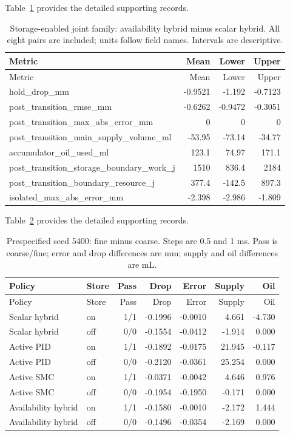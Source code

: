 \documentclass[11pt,a4paper]{article}
\begin{document}
\begingroup\hypersetup{hypertexnames=true}\small\setlength{\tabcolsep}{4pt}
Table~\ref{supp:longtable:9} provides the detailed supporting records.
\begin{longtable}{lrrr}
\caption{Storage-enabled joint family: availability hybrid minus scalar hybrid. All eight pairs are included; units follow field names. Intervals are descriptive.}\label{supp:longtable:9}\\\toprule
Metric & Mean & Lower & Upper\\\midrule\endfirsthead
\toprule
Metric & Mean & Lower & Upper\\\midrule\endhead
hold\_drop\_mm & -0.9521 & -1.192 & -0.7123\\
post\_transition\_rmse\_mm & -0.6262 & -0.9472 & -0.3051\\
post\_transition\_max\_abs\_error\_mm & 0 & 0 & 0\\
post\_transition\_main\_supply\_volume\_ml & -53.95 & -73.14 & -34.77\\
accumulator\_oil\_used\_ml & 123.1 & 74.97 & 171.1\\
post\_transition\_storage\_boundary\_work\_j & 1510 & 836.4 & 2184\\
post\_transition\_boundary\_resource\_j & 377.4 & -142.5 & 897.3\\
isolated\_max\_abs\_error\_mm & -2.398 & -2.986 & -1.809\\
\bottomrule\end{longtable}\endgroup

\begingroup\hypersetup{hypertexnames=true}\small\setlength{\tabcolsep}{4pt}
Table~\ref{supp:longtable:10} provides the detailed supporting records.
\begin{longtable}{llrrrrr}
\caption{Prespecified seed 5400: fine minus coarse. Steps are 0.5 and 1 ms. Pass is coarse/fine; error and drop differences are mm; supply and oil differences are mL.}\label{supp:longtable:10}\\\toprule
Policy & Store & Pass & Drop & Error & Supply & Oil\\\midrule\endfirsthead
\toprule
Policy & Store & Pass & Drop & Error & Supply & Oil\\\midrule\endhead
Scalar hybrid & on & 1/1 & -0.1996 & -0.0010 & 4.661 & -4.730\\
Scalar hybrid & off & 0/0 & -0.1554 & -0.0412 & -1.914 & 0.000\\
Active PID & on & 1/1 & -0.1892 & -0.0175 & 21.945 & -0.117\\
Active PID & off & 0/0 & -0.2120 & -0.0361 & 25.254 & 0.000\\
Active SMC & on & 1/1 & -0.0371 & -0.0042 & 4.646 & 0.976\\
Active SMC & off & 0/0 & -0.1954 & -0.1950 & -0.171 & 0.000\\
Availability hybrid & on & 1/1 & -0.1580 & -0.0010 & -2.172 & 1.444\\
Availability hybrid & off & 0/0 & -0.1496 & -0.0354 & -2.169 & 0.000\\
\bottomrule\end{longtable}\endgroup
\end{document}
